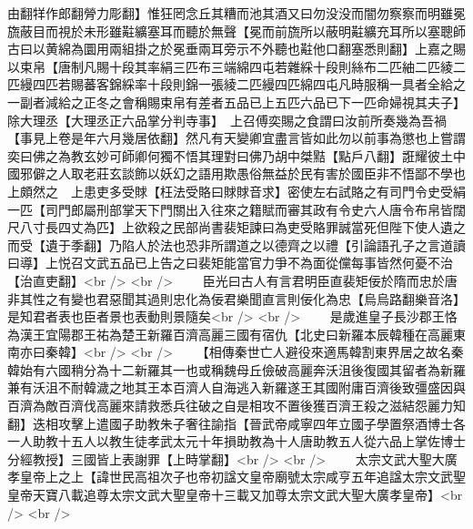 由翻䍧作郎翻膋力彫翻】惟狂罔念丘其糟而池其酒又曰勿没没而闇勿察察而明雖冕旒蔽目而視於未形雖黈纊塞耳而聽於無聲【冕而前旒所以蔽明黈纊充耳所以塞聰師古曰以黄綿為圜用兩組掛之於冕垂兩耳旁示不外聽也黈他口翻塞悉則翻】上嘉之賜以束帛【唐制凡賜十段其率絹三匹布三端綿四屯若雜綵十段則絲布二匹紬二匹綾二匹縵四匹若賜蕃客錦綵率十段則錦一張綾二匹縵四匹綿四屯凡時服稱一具者全給之一副者減給之正冬之會稱賜束帛有差者五品已上五匹六品已下一匹命婦視其夫子】除大理丞【大理丞正六品掌分判寺事】　上召傅奕賜之食謂曰汝前所奏幾為吾禍【事見上卷是年六月幾居依翻】然凡有天變卿宜盡言皆如此勿以前事為懲也上嘗謂奕曰佛之為教玄妙可師卿何獨不悟其理對曰佛乃胡中桀黠【點戶八翻】誑耀彼土中國邪僻之人取老莊玄談飾以妖幻之語用欺愚俗無益於民有害於國臣非不悟鄙不學也上頗然之　上患吏多受賕【枉法受賂曰賕賕音求】密使左右試賂之有司門令史受絹一匹【司門郎屬刑部掌天下門關出入往來之籍賦而審其政有令史六人唐令布帛皆闊尺八寸長四丈為匹】上欲殺之民部尚書裴矩諫曰為吏受賂罪誠當死但陛下使人遺之而受【遺于季翻】乃陷人於法也恐非所謂道之以德齊之以禮【引論語孔子之言道讀曰導】上悦召文武五品已上告之曰裴矩能當官力爭不為面從儻每事皆然何憂不治【治直吏翻】<br />
<br />
　　臣光曰古人有言君明臣直裴矩佞於隋而忠於唐非其性之有變也君惡聞其過則忠化為佞君樂聞直言則佞化為忠【烏烏路翻樂音洛】是知君者表也臣者景也表動則景隨矣<br />
<br />
　　是歲進皇子長沙郡王恪為漢王宜陽郡王祐為楚王新羅百濟高麗三國有宿仇【北史曰新羅本辰韓種在高麗東南亦曰秦韓】<br />
<br />
　　【相傳秦世亡人避役來適馬韓割東界居之故名秦韓始有六國稍分為十二新羅其一也或稱魏母丘儉破高麗奔沃沮後復國其留者為新羅兼有沃沮不耐韓濊之地其王本百濟人自海逃入新羅遂王其國附庸百濟後致彊盛因與百濟為敵百濟伐高麗來請救悉兵往破之自是相攻不置後獲百濟王殺之滋結怨麗力知翻】迭相攻擊上遣國子助教朱子奢往諭指【晉武帝咸寧四年立國子學置祭酒博士各一人助教十五人以教生徒孝武太元十年損助教為十人唐助教五人從六品上掌佐博士分經教授】三國皆上表謝罪【上時掌翻】<br />
<br />
　　太宗文武大聖大廣孝皇帝上之上【諱世民高祖次子也帝初諡文皇帝廟號太宗咸亨五年追諡太宗文武聖皇帝天寶八載追尊太宗文武大聖皇帝十三載又加尊太宗文武大聖大廣孝皇帝】<br />
<br />
